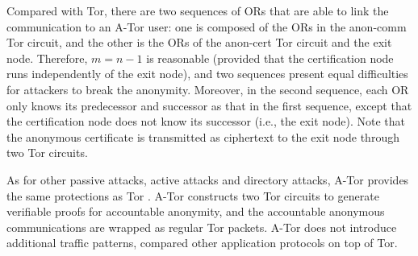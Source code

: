 Compared with Tor,
  there are two sequences of ORs that are able to link the communication to an A-Tor user:
  one is composed of the ORs in the anon-comm Tor circuit,
  and the other is the ORs of the anon-cert Tor circuit and the exit node.
Therefore,
    $m = n-1$ is reasonable (provided that the certification node runs independently of the exit node),
    and two sequences present equal difficulties for attackers to break the anonymity.
Moreover,
    in the second sequence,
    each OR only knows its predecessor and successor as that in the first sequence,
    except that the certification node does not know its successor (i.e., the exit node).
Note that the anonymous certificate is %
   transmitted as ciphertext to the exit node through two Tor circuits.



As for other passive attacks, active attacks and directory attacks,
 A-Tor provides the same protections as Tor \cite{dingledine2004tor}.
A-Tor constructs two Tor circuits to generate verifiable proofs for accountable anonymity,
   and the accountable anonymous communications are wrapped as regular Tor packets.
A-Tor does not introduce additional traffic patterns,
   compared other application protocols on top of Tor.

